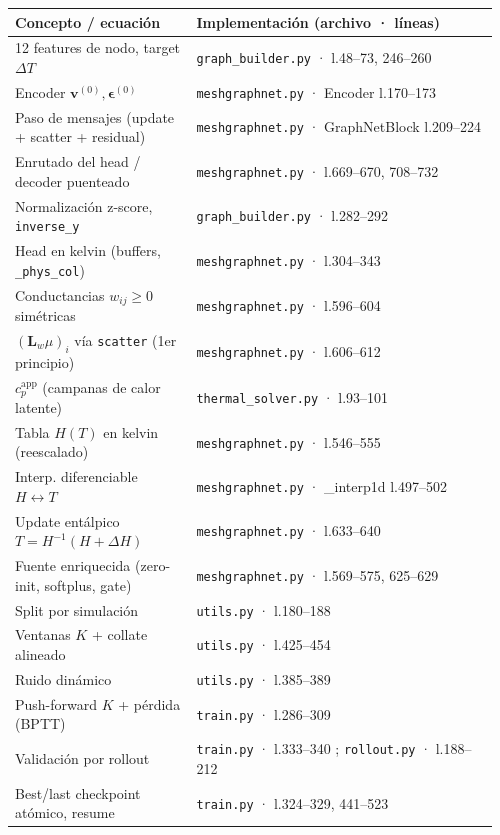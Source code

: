 \documentclass[11pt]{article}
\newcommand{\Lw}{\bm{L}_{w}}
\newcommand{\cpapp}{c_p^{\mathrm{app}}}
\theoremstyle{definition}
\theoremstyle{plain}
\begin{document}
\renewcommand{\arraystretch}{1.25}
\noindent\small
\begin{tabular}{@{}p{0.36\linewidth}p{0.60\linewidth}@{}}
\toprule
Concepto / ecuación & Implementación (archivo · líneas) \\
\midrule
12 features de nodo, target $\Delta T$ & \texttt{graph\_builder.py} · l.48--73, 246--260 \\
Encoder $\bm v^{(0)},\bm\epsilon^{(0)}$ & \texttt{meshgraphnet.py} · Encoder l.170--173 \\
Paso de mensajes (update + scatter + residual) & \texttt{meshgraphnet.py} · GraphNetBlock l.209--224 \\
Enrutado del head / decoder puenteado & \texttt{meshgraphnet.py} · l.669--670, 708--732 \\
Normalización z-score, \texttt{inverse\_y} & \texttt{graph\_builder.py} · l.282--292 \\
Head en kelvin (buffers, \texttt{\_phys\_col}) & \texttt{meshgraphnet.py} · l.304--343 \\
Conductancias $w_{ij}\ge0$ simétricas & \texttt{meshgraphnet.py} · l.596--604 \\
$(\Lw\mu)_i$ vía \texttt{scatter} (1er principio) & \texttt{meshgraphnet.py} · l.606--612 \\
$\cpapp$ (campanas de calor latente) & \texttt{thermal\_solver.py} · l.93--101 \\
Tabla $H(T)$ en kelvin (reescalado) & \texttt{meshgraphnet.py} · l.546--555 \\
Interp. diferenciable $H\leftrightarrow T$ & \texttt{meshgraphnet.py} · \_interp1d l.497--502 \\
Update entálpico $T{=}H^{-1}(H{+}\Delta H)$ & \texttt{meshgraphnet.py} · l.633--640 \\
Fuente enriquecida (zero-init, softplus, gate) & \texttt{meshgraphnet.py} · l.569--575, 625--629 \\
Split por simulación & \texttt{utils.py} · l.180--188 \\
Ventanas $K$ + collate alineado & \texttt{utils.py} · l.425--454 \\
Ruido dinámico & \texttt{utils.py} · l.385--389 \\
Push-forward $K$ + pérdida (BPTT) & \texttt{train.py} · l.286--309 \\
Validación por rollout & \texttt{train.py} · l.333--340 ; \texttt{rollout.py} · l.188--212 \\
Best/last checkpoint atómico, resume & \texttt{train.py} · l.324--329, 441--523 \\
\bottomrule
\end{tabular}
\end{document}
